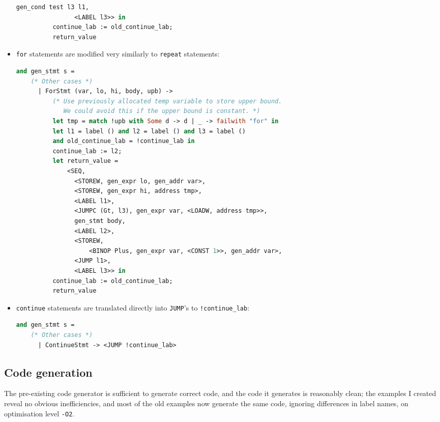 \documentclass[a4paper,9pt]{article}
\begin{document}
\begin{itemize}
\begin{lstlisting}[language=ml]
                gen_cond test l3 l1,
                <LABEL l3>> in
          continue_lab := old_continue_lab;
          return_value
\end{lstlisting}
    \item \texttt{for} statements are modified very similarly to \texttt{repeat} statements:
\begin{lstlisting}[language=ml]
and gen_stmt s = 
    (* Other cases *)
      | ForStmt (var, lo, hi, body, upb) ->
          (* Use previously allocated temp variable to store upper bound.
             We could avoid this if the upper bound is constant. *)
          let tmp = match !upb with Some d -> d | _ -> failwith "for" in
          let l1 = label () and l2 = label () and l3 = label ()
          and old_continue_lab = !continue_lab in
          continue_lab := l2;
          let return_value =
              <SEQ,
                <STOREW, gen_expr lo, gen_addr var>,
                <STOREW, gen_expr hi, address tmp>,
                <LABEL l1>,
                <JUMPC (Gt, l3), gen_expr var, <LOADW, address tmp>>,
                gen_stmt body,
                <LABEL l2>,
                <STOREW,
                    <BINOP Plus, gen_expr var, <CONST 1>>, gen_addr var>,
                <JUMP l1>,
                <LABEL l3>> in
          continue_lab := old_continue_lab;
          return_value
\end{lstlisting}
    \item \texttt{continue} statements are translated directly into \texttt{JUMP}'s to \texttt{!continue\_lab}:
\begin{lstlisting}[language=ml]
and gen_stmt s = 
    (* Other cases *)
      | ContinueStmt -> <JUMP !continue_lab>
\end{lstlisting}
\end{itemize}
\subsection{Code generation}
The pre-existing code generator is sufficient to generate correct code, and the code it generates is reasonably clean; the examples I created reveal no obvious inefficiencies, and most of the old examples now generate the same code, ignoring differences in label names, on optimisation level \texttt{-O2}.
\end{document}
